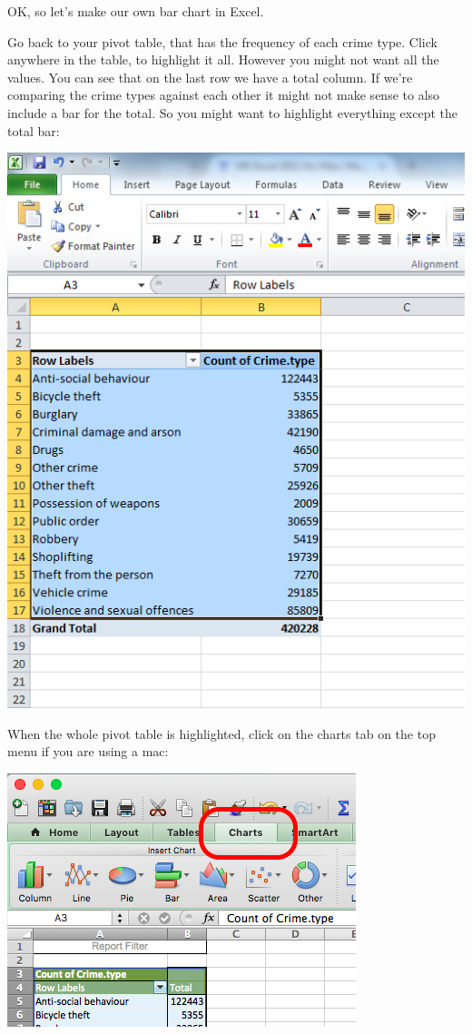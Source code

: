 \documentclass[
]{book}
\begin{document}
OK, so let's make our own bar chart in Excel.

Go back to your pivot table, that has the frequency of each crime type. Click anywhere in the table, to highlight it all. However you might not want all the values. You can see that on the last row we have a total column. If we're comparing the crime types against each other it might not make sense to also include a bar for the total. So you might want to highlight everything except the total bar:

\includegraphics{imgs/crime_type_table.png}

When the whole pivot table is highlighted, click on the charts tab on the top menu if you are using a mac:

\includegraphics{imgs/click_charts_tab.png}
\end{document}
